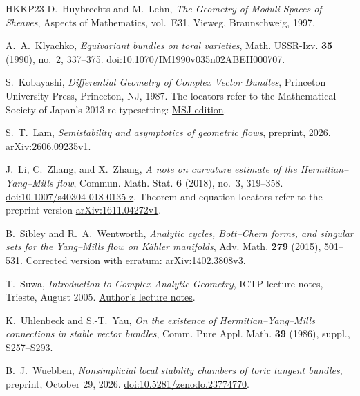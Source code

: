 \documentclass[11pt]{amsart}
\theoremstyle{definition}
\theoremstyle{remark}
\begin{document}
\begin{thebibliography}{HKKP23}
D.~Huybrechts and M.~Lehn, \emph{The Geometry of Moduli Spaces of Sheaves},
Aspects of Mathematics, vol.~E31, Vieweg, Braunschweig, 1997.

A.~A.~Klyachko, \emph{Equivariant bundles on toral varieties},
Math. USSR-Izv. \textbf{35} (1990), no.~2, 337--375.
\href{https://doi.org/10.1070/IM1990v035n02ABEH000707}{doi:10.1070/IM1990v035n02ABEH000707}.

S.~Kobayashi, \emph{Differential Geometry of Complex Vector Bundles},
Princeton University Press, Princeton, NJ, 1987.
The locators refer to the Mathematical Society of Japan's 2013
re-typesetting: \href{https://www.mathsoc.jp/assets/pdf/publications/pubmsj/Vol15.pdf}{MSJ edition}.

S.~T.~Lam, \emph{Semistability and asymptotics of geometric flows},
preprint, 2026.
\href{https://arxiv.org/abs/2606.09235v1}{arXiv:2606.09235v1}.

J.~Li, C.~Zhang, and X.~Zhang,
\emph{A note on curvature estimate of the Hermitian--Yang--Mills flow},
Commun. Math. Stat. \textbf{6} (2018), no.~3, 319--358.
\href{https://doi.org/10.1007/s40304-018-0135-z}{doi:10.1007/s40304-018-0135-z}.
Theorem and equation locators refer to the preprint version
\href{https://arxiv.org/abs/1611.04272v1}{arXiv:1611.04272v1}.

B.~Sibley and R.~A.~Wentworth,
\emph{Analytic cycles, Bott--Chern forms, and singular sets for the
Yang--Mills flow on K\"ahler manifolds},
Adv. Math. \textbf{279} (2015), 501--531.
Corrected version with erratum:
\href{https://arxiv.org/abs/1402.3808v3}{arXiv:1402.3808v3}.

T.~Suwa, \emph{Introduction to Complex Analytic Geometry},
ICTP lecture notes, Trieste, August 2005.
\href{https://indico.ictp.it/event/a04204/session/7/contribution/5/material/0/0.pdf}{Author's lecture notes}.

K.~Uhlenbeck and S.-T.~Yau,
\emph{On the existence of Hermitian--Yang--Mills connections in stable
vector bundles}, Comm. Pure Appl. Math. \textbf{39} (1986), suppl.,
S257--S293.

B.~J.~Wuebben, \emph{Nonsimplicial local stability chambers of toric
tangent bundles}, preprint, October 29, 2026.
\href{https://doi.org/10.5281/zenodo.23774770}{doi:10.5281/zenodo.23774770}.

\end{thebibliography}
\end{document}
